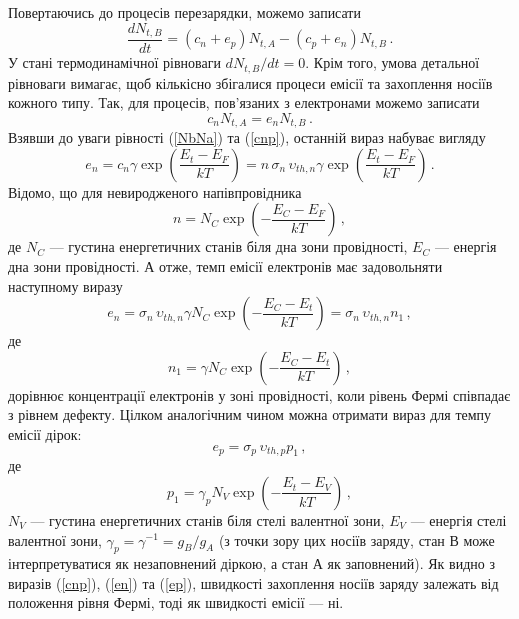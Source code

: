 Повертаючись до процесів перезарядки, можемо записати
\begin{equation}
\label{dNdt}
 \frac{dN_{t,B}}{dt}=\left(c_n+e_p\right)N_{t,A}-\left(c_p+e_n\right)N_{t,B}\,.
\end{equation}
У стані термодинамічної рівноваги $dN_{t,B}/dt=0$.
Крім того, умова детальної рівноваги вимагає, щоб кількісно збігалися
процеси емісії та захоплення носіїв кожного типу.
Так, для процесів, пов'язаних з електронами можемо записати
\begin{equation}
\label{rivn}
 c_nN_{t,A}=e_nN_{t,B}\,.
\end{equation}
Взявши до уваги рівності (\ref{NbNa}) та (\ref{cnp}), останній вираз набуває вигляду
\begin{equation}
\label{ecn}
e_n=c_n\gamma\exp\left(\frac{E_t-E_F}{kT}\right)=n\,\sigma_n\,\upsilon_{th,n}\gamma\exp\left(\frac{E_t-E_F}{kT}\right)\,.
\end{equation}
Відомо, що для невиродженого напівпровідника
\begin{equation}
\label{n}
n=N_C\exp\left(-\frac{E_C-E_F}{kT}\right)\,,
\end{equation}
де
$N_C$ --- густина енергетичних станів біля дна зони провідності,
$E_C$ --- енергія дна зони провідності.
А отже, темп емісії електронів має задовольняти наступному виразу
\begin{equation}
\label{en}
e_n=\sigma_n\,\upsilon_{th,n}\gamma N_C \exp\left(-\frac{E_C-E_t}{kT}\right)=\sigma_n\,\upsilon_{th,n}n_1\,,
\end{equation}
де
\begin{equation}
\label{n1}
n_1=\gamma N_C \exp\left(-\frac{E_C-E_t}{kT}\right)\,,
\end{equation}
дорівнює концентрації електронів у зоні провідності, коли рівень Фермі
співпадає з рівнем дефекту.
Цілком аналогічним чином можна отримати вираз для темпу емісії дірок:
\begin{equation}
\label{ep}
e_p=\sigma_p\,\upsilon_{th,p}p_1\,,
\end{equation}
де
\begin{equation}
\label{p1}
p_1=\gamma_p N_V \exp\left(-\frac{E_t-E_V}{kT}\right)\,,
\end{equation}
$N_V$ --- густина енергетичних станів біля стелі валентної зони,
$E_V$ --- енергія стелі валентної зони,
$\gamma_p=\gamma^{-1}=g_{B}/g_{A}$ (з точки зору цих носіїв заряду, стан В може інтерпретуватися як незаповнений діркою,
а стан А як заповнений).
Як видно з виразів (\ref{cnp}), (\ref{en}) та  (\ref{ep}),
швидкості захоплення носіїв заряду залежать від положення рівня Фермі,
тоді як швидкості емісії --- ні.

